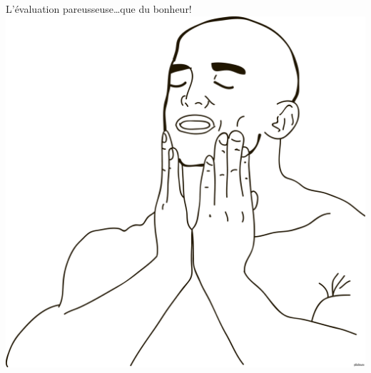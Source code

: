 \begin{frame}[fragile]{L'évaluation pareusseuse}{\ldots que du bonheur!}
    \includegraphics[width=\textwidth]{meme/feels-good.png}
\end{frame}
